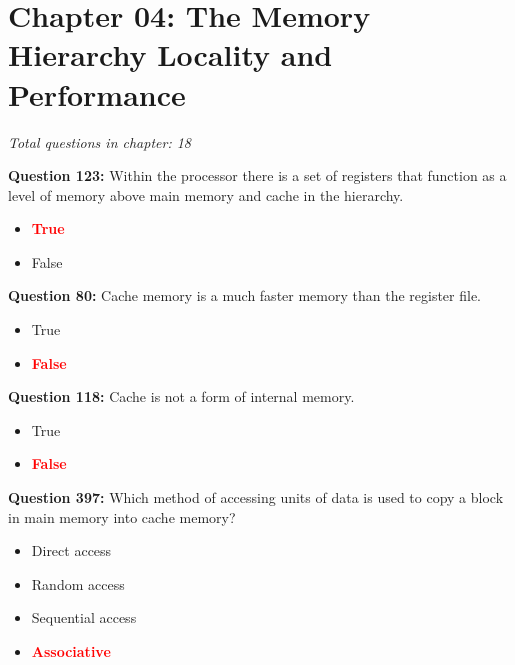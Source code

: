 \documentclass[12pt,a4paper]{article}
\begin{document}
\section{Chapter 04: The Memory Hierarchy Locality and Performance}
\textit{Total questions in chapter: 18}

\textbf{Question 123:} Within the processor there is a set of registers that function as a level of memory above main memory and cache in the hierarchy.

\begin{itemize}
    \item[\textbf{A.}] \textcolor{red}{\textbf{True}}
    \item[\textbf{B.}] False
\end{itemize}

\vspace{0.5cm}

\vspace{0.5cm}

\textbf{Question 80:} Cache memory is a much faster memory than the register file.

\begin{itemize}
    \item[\textbf{A.}] True
    \item[\textbf{B.}] \textcolor{red}{\textbf{False}}
\end{itemize}

\vspace{0.5cm}

\vspace{0.5cm}

\textbf{Question 118:} Cache is not a form of internal memory.

\begin{itemize}
    \item[\textbf{A.}] True
    \item[\textbf{B.}] \textcolor{red}{\textbf{False}}
\end{itemize}

\vspace{0.5cm}

\vspace{0.5cm}

\textbf{Question 397:} Which method of accessing units of data is used to copy a block in main memory into cache memory?

\begin{itemize}
    \item[\textbf{A.}] Direct access
    \item[\textbf{B.}] Random access
    \item[\textbf{C.}] Sequential access
    \item[\textbf{D.}] \textcolor{red}{\textbf{Associative}}
\end{itemize}
\end{document}
